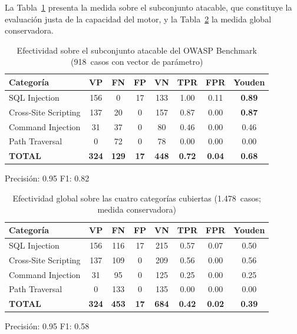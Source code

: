 \documentclass[12pt, a4paper]{article}
\begin{document}
La Tabla~\ref{tab:benchmark-atacable} presenta la medida sobre el subconjunto
atacable, que constituye la evaluación justa de la capacidad del motor, y la
Tabla~\ref{tab:benchmark-global} la medida global conservadora.

\begin{table}[H]
    \centering
    \caption{Efectividad sobre el subconjunto atacable del OWASP Benchmark (918~casos con vector de parámetro)}
    \label{tab:benchmark-atacable}
    \small
    \begin{tabular}{l c c c c c c c}
        \toprule
        \textbf{Categoría} & \textbf{VP} & \textbf{FN} & \textbf{FP} & \textbf{VN} & \textbf{TPR} & \textbf{FPR} & \textbf{Youden} \\
        \midrule
        SQL Injection      & 156 &   0 & 17 & 133 & 1.00 & 0.11 & \textbf{0.89} \\
        Cross-Site Scripting & 137 &  20 &  0 & 157 & 0.87 & 0.00 & \textbf{0.87} \\
        Command Injection  &  31 &  37 &  0 &  80 & 0.46 & 0.00 & 0.46 \\
        Path Traversal     &   0 &  72 &  0 &  78 & 0.00 & 0.00 & 0.00 \\
        \midrule
        \textbf{TOTAL}     & \textbf{324} & \textbf{129} & \textbf{17} & \textbf{448} & \textbf{0.72} & \textbf{0.04} & \textbf{0.68} \\
        \bottomrule
    \end{tabular}

    \vspace{0.4em}
    {\footnotesize Precisión: 0.95 \quad F1: 0.82}
\end{table}

\begin{table}[H]
    \centering
    \caption{Efectividad global sobre las cuatro categorías cubiertas (1.478~casos; medida conservadora)}
    \label{tab:benchmark-global}
    \small
    \begin{tabular}{l c c c c c c c}
        \toprule
        \textbf{Categoría} & \textbf{VP} & \textbf{FN} & \textbf{FP} & \textbf{VN} & \textbf{TPR} & \textbf{FPR} & \textbf{Youden} \\
        \midrule
        SQL Injection      & 156 & 116 & 17 & 215 & 0.57 & 0.07 & 0.50 \\
        Cross-Site Scripting & 137 & 109 &  0 & 209 & 0.56 & 0.00 & 0.56 \\
        Command Injection  &  31 &  95 &  0 & 125 & 0.25 & 0.00 & 0.25 \\
        Path Traversal     &   0 & 133 &  0 & 135 & 0.00 & 0.00 & 0.00 \\
        \midrule
        \textbf{TOTAL}     & \textbf{324} & \textbf{453} & \textbf{17} & \textbf{684} & \textbf{0.42} & \textbf{0.02} & \textbf{0.39} \\
        \bottomrule
    \end{tabular}

    \vspace{0.4em}
    {\footnotesize Precisión: 0.95 \quad F1: 0.58}
\end{table}
\end{document}
